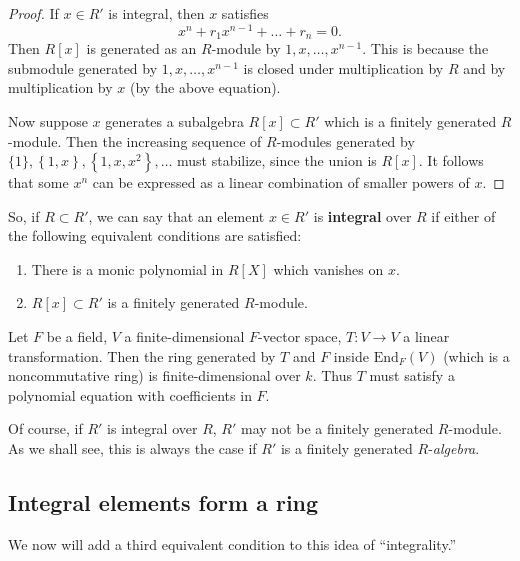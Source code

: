 \begin{proof} 
If $x  \in R'$ is integral, then $x$ satisfies
\[ x^n + r_1 x^{n-1}+\dots+r_n = 0.  \]
Then $R[x]$ is generated as an $R$-module by $1, x, \dots, x^{n-1}$.  This is
because the submodule generated by $1, x ,\dots, x^{n-1}$ is closed under
multiplication by $R$ and by multiplication by $x$ (by the above equation). 

Now suppose $x$ generates a subalgebra $R[x] \subset R'$ which is a finitely
generated $R$-module.  Then the increasing sequence
of $R$-modules generated by $\{1\}, \left\{1, x\right\}, \left\{1, x, x^2\right\}
, \dots$ must stabilize, since the union is $R[x]$.  It follows that some $x^n$
can be expressed as a linear combination of smaller powers of $x$. 
\end{proof} 

So, if $R \subset R'$, we can say that
an element $x \in R'$ is \textbf{integral} over $R$ if either of the following
equivalent conditions are satisfied:

\begin{enumerate}
\item There is a monic polynomial in $R[X]$ which vanishes on $x$.
\item $R[x] \subset R'$ is a finitely generated $R$-module.
\end{enumerate}

\begin{example} 
Let $F$ be a field, $V$ a finite-dimensional $F$-vector space, $T: V \to V$ a
linear transformation. Then the ring generated by $T$ and $F$ inside
$\mathrm{End}_F(V)$ (which is a noncommutative ring) is finite-dimensional over $k$. 
Thus $T$ must satisfy a polynomial equation with coefficients in $F$.
\end{example} 

Of course, if $R'$ is integral over $R$, $R'$ may not be a finitely generated
$R$-module. As we shall see, this is always the case if $R'$ is a finitely
generated $R$-\emph{algebra}.


\subsection{Integral elements form a ring}

We now will add a third equivalent condition to this idea of ``integrality.''

